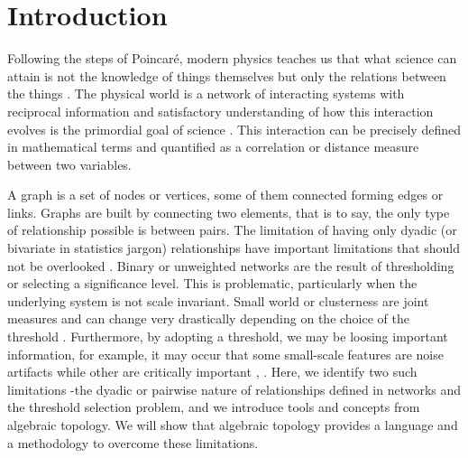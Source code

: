 \documentclass[onecollarge,runningheads]{svjour2}
\begin{document}
\section{Introduction}
Following the steps of Poincar{\'e}, modern physics teaches us that what science can attain is not the knowledge of things themselves but only the relations between the things \cite{Poincare:1952}. The physical world is a network of interacting systems with reciprocal information and satisfactory understanding of how this interaction evolves is the primordial goal of science \cite{rovelli2015relative}.
This interaction can be precisely defined in mathematical terms and quantified as a correlation or distance measure between two variables.

A graph is a set of nodes or vertices, some of them connected forming edges or links. Graphs are built by connecting two elements, that is to say, the only type of relationship possible is between pairs. The limitation of having only dyadic (or bivariate in statistics jargon) relationships have important limitations that should not be overlooked \cite{giusti2016two}.
Binary or unweighted networks are the result of thresholding or selecting a significance level. This is problematic, particularly when the underlying system is not scale invariant. Small world or clusterness are joint measures and can change very drastically depending on the choice of the threshold \cite{toppi2012statistical}. Furthermore, by adopting a threshold, we may be loosing important information, for example, it may occur that some small-scale features are noise artifacts while other are critically important \cite{fallani2014graph}, \cite{papo2014complex}.
Here, we identify two such limitations -the dyadic or pairwise nature of relationships defined in networks and the threshold selection problem, and we introduce tools and concepts from algebraic topology. We will show that algebraic topology \cite{munkres1984elements} provides a language and a methodology to overcome these limitations.
\end{document}
